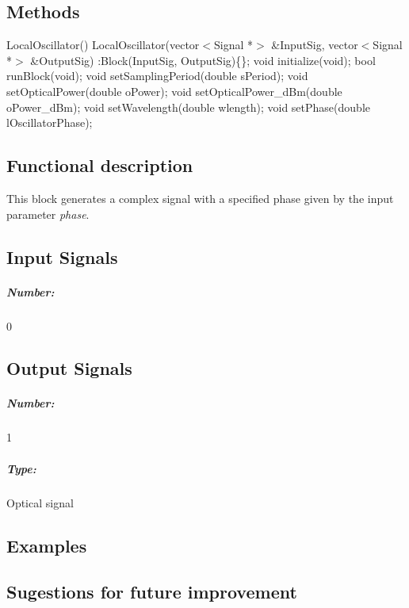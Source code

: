 \subsection*{Methods}

LocalOscillator() {}
\bigbreak
LocalOscillator(vector$<$Signal *$>$ \&InputSig, vector$<$Signal *$>$ \&OutputSig) :Block(InputSig, OutputSig)\{\};
\bigbreak
void initialize(void);
\bigbreak
bool runBlock(void);
\bigbreak
void setSamplingPeriod(double sPeriod);
\bigbreak
void setOpticalPower(double oPower);
\bigbreak
void setOpticalPower\_dBm(double oPower\_dBm);
\bigbreak
void setWavelength(double wlength);
\bigbreak
void setPhase(double lOscillatorPhase);

\subsection*{Functional description}

This block generates a complex signal with a specified phase given by the input parameter \textit{phase}.

\pagebreak
\subsection*{Input Signals}

\subparagraph*{Number:} 0

\subsection*{Output Signals}

\subparagraph*{Number:} 1

\subparagraph*{Type:} Optical signal

\subsection*{Examples}

\subsection*{Sugestions for future improvement}



